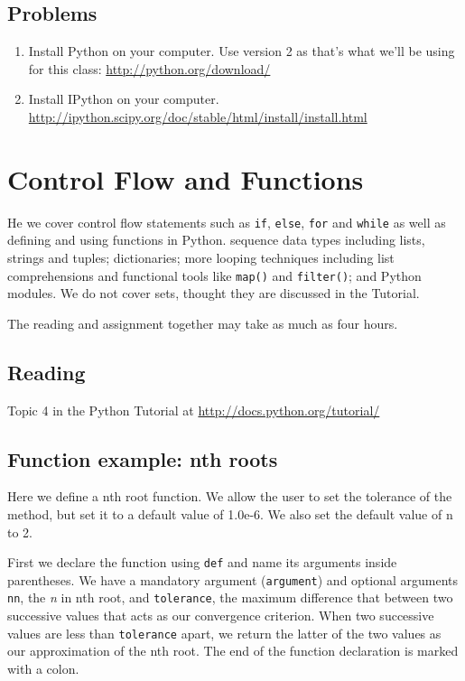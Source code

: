 \subsection{Problems}

\begin{enumerate}
  \item Install Python on your computer. Use version 2 as that's what we'll be using for this class: \url{http://python.org/download/}
  \item Install IPython on your computer. \url{http://ipython.scipy.org/doc/stable/html/install/install.html}
\end{enumerate}

\section{Control Flow and Functions}
He we cover control flow statements such as \verb|if|, \verb|else|, \verb|for| and \verb|while| as well as defining and using functions in Python. sequence data types including lists, strings and tuples; dictionaries; more looping techniques including list comprehensions and functional tools like \verb|map()| and \verb|filter()|; and Python modules. We do not cover sets, thought they are discussed in the Tutorial.

The reading and assignment together may take as much as four hours.

\subsection{Reading}
Topic 4 in the Python Tutorial at \url{http://docs.python.org/tutorial/} \cite{website:Python272docs}

\subsection{Function example: nth roots}
Here we define a nth root function.  We allow the user to set the tolerance of the method, but set it to a default value of 1.0e-6. We also set the default value of n to 2.

First we declare the function using \verb|def| and name its arguments inside parentheses. We have a mandatory argument (\verb|argument|) and optional arguments \verb|nn|, the \emph{n} in nth root, and \verb|tolerance|, the maximum difference that between two successive values that acts as our convergence criterion. When two successive values are less than \verb|tolerance| apart, we return the latter of the two values as our approximation of the nth root. The end of the function declaration is marked with a colon.

